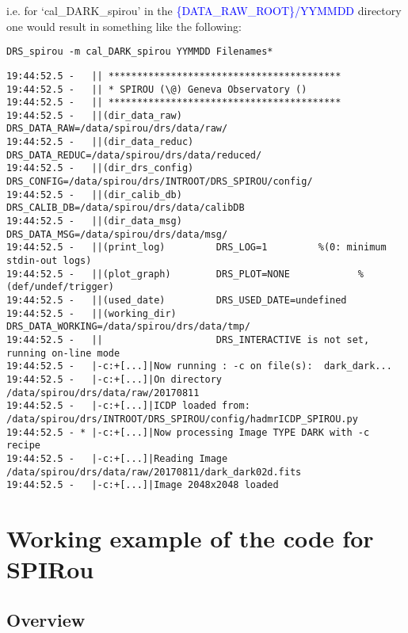 \noindent i.e. for `cal\_DARK\_spirou' in the \textcolor{blue}{\{DATA\_RAW\_ROOT\}/YYMMDD} directory one would result in something like the following:
\begin{lstlisting}[style=bashstyle]
DRS_spirou -m cal_DARK_spirou YYMMDD Filenames*
\end{lstlisting}
\begin{lstlisting}[style=bashstyle]
19:44:52.5 -   || *****************************************
19:44:52.5 -   || * SPIROU (\@) Geneva Observatory ()
19:44:52.5 -   || *****************************************
19:44:52.5 -   ||(dir_data_raw)      DRS_DATA_RAW=/data/spirou/drs/data/raw/
19:44:52.5 -   ||(dir_data_reduc)    DRS_DATA_REDUC=/data/spirou/drs/data/reduced/
19:44:52.5 -   ||(dir_drs_config)    DRS_CONFIG=/data/spirou/drs/INTROOT/DRS_SPIROU/config/
19:44:52.5 -   ||(dir_calib_db)      DRS_CALIB_DB=/data/spirou/drs/data/calibDB
19:44:52.5 -   ||(dir_data_msg)      DRS_DATA_MSG=/data/spirou/drs/data/msg/
19:44:52.5 -   ||(print_log)         DRS_LOG=1         %(0: minimum stdin-out logs)
19:44:52.5 -   ||(plot_graph)        DRS_PLOT=NONE            %(def/undef/trigger)
19:44:52.5 -   ||(used_date)         DRS_USED_DATE=undefined
19:44:52.5 -   ||(working_dir)       DRS_DATA_WORKING=/data/spirou/drs/data/tmp/
19:44:52.5 -   ||                    DRS_INTERACTIVE is not set, running on-line mode
19:44:52.5 -   |-c:+[...]|Now running : -c on file(s):  dark_dark...
19:44:52.5 -   |-c:+[...]|On directory /data/spirou/drs/data/raw/20170811
19:44:52.5 -   |-c:+[...]|ICDP loaded from: /data/spirou/drs/INTROOT/DRS_SPIROU/config/hadmrICDP_SPIROU.py
19:44:52.5 - * |-c:+[...]|Now processing Image TYPE DARK with -c recipe
19:44:52.5 -   |-c:+[...]|Reading Image /data/spirou/drs/data/raw/20170811/dark_dark02d.fits
19:44:52.5 -   |-c:+[...]|Image 2048x2048 loaded

\end{lstlisting}

\newpage
\section{Working example of the code for SPIRou}
\label{section:working_example}

\subsection{Overview}

